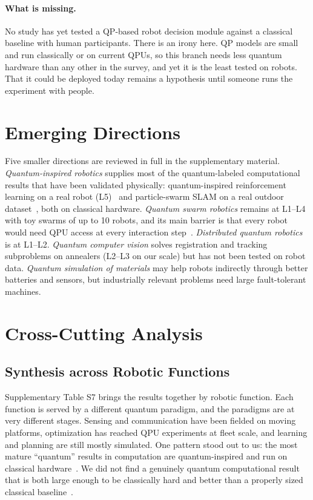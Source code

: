 \documentclass[acmsmall,screen,review]{acmart}
\begin{document}
\paragraph{What is missing.} No study has yet tested a QP-based robot decision module against a classical baseline with human participants. There is an irony here. QP models are small and run classically or on current QPUs, so this branch needs less quantum hardware than any other in the survey, and yet it is the least tested on robots. That it could be deployed today remains a hypothesis until someone runs the experiment with people.


\section{Emerging Directions}\label{sec:emerging}
Five smaller directions are reviewed in full in the supplementary material. \emph{Quantum-inspired robotics} supplies most of the quantum-labeled computational results that have been validated physically: quantum-inspired reinforcement learning on a real robot (L5)~\cite{Dong2012} and particle-swarm SLAM on a real outdoor dataset~\cite{Zuo2018}, both on classical hardware. \emph{Quantum swarm robotics} remains at L1--L4 with toy swarms of up to 10 robots, and its main barrier is that every robot would need QPU access at every interaction step~\cite{Mannone2025}. \emph{Distributed quantum robotics} is at L1--L2. \emph{Quantum computer vision} solves registration and tracking subproblems on annealers (L2--L3 on our scale) but has not been tested on robot data. \emph{Quantum simulation of materials} may help robots indirectly through better batteries and sensors, but industrially relevant problems need large fault-tolerant machines.


\section{Cross-Cutting Analysis}\label{sec:analysis}

\subsection{Synthesis across Robotic Functions}\label{sec:synthesis}
Supplementary Table S7 brings the results together by robotic function. Each function is served by a different quantum paradigm, and the paradigms are at very different stages. Sensing and communication have been fielded on moving platforms, optimization has reached QPU experiments at fleet scale, and learning and planning are still mostly simulated. One pattern stood out to us: the most mature ``quantum'' results in computation are quantum-inspired and run on classical hardware~\cite{Dong2012,Zuo2018}. We did not find a genuinely quantum computational result that is both large enough to be classically hard and better than a properly sized classical baseline~\cite{Hohenfeld2024,Dragan2025,Ohzeki2019,Leib2023}.
\end{document}
